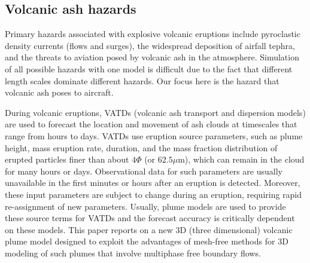 \documentclass[gmd, manuscript]{copernicus}
\begin{document}
\introduction  %
\subsection{Volcanic ash hazards}
Primary hazards associated with explosive volcanic eruptions include pyroclastic density currents (flows and surges), the widespread deposition of airfall tephra, and the threats to aviation posed by volcanic ash in the atmosphere.
Simulation of all possible hazards with one model is difficult due to the fact that different length scales dominate different hazards. Our focus here is the hazard that volcanic ash poses to aircraft. 

During volcanic eruptions, VATDs (volcanic ash transport and dispersion models) are used to forecast the location and movement of ash clouds at timescales that range from hours to days. VATDs use eruption source parameters, such as plume height, mass eruption rate, duration, and the mass fraction distribution of erupted particles finer than about $4 \Phi$ (or $62.5 \mu$m), which can remain in the cloud for many hours or days. Observational data for such parameters are usually unavailable in the first minutes or hours after an eruption is detected. Moreover, these input parameters are subject to change during an eruption, requiring rapid re-assignment of new parameters. Usually, plume models are used to provide these source terms for VATDs and the forecast accuracy is critically dependent on these models. This paper reports on a new 3D (three dimensional) volcanic plume model designed to exploit the advantages of mesh-free methods for 3D modeling of such plumes that involve multiphase free boundary flows.

\end{document}
